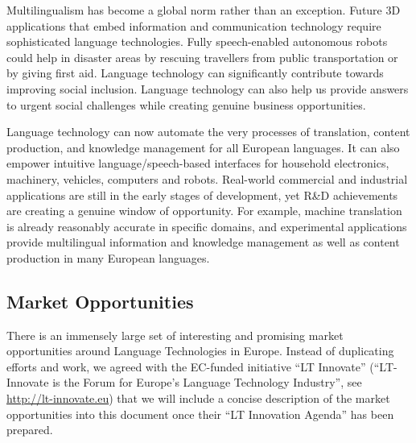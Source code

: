 \documentclass[10pt, plain]{../../metanetpaper}
\begin{document}
\begin{multicols}{2}
Multilingualism has become a global norm rather than an exception. Future 3D applications that embed information and communication technology require sophisticated language technologies. Fully speech-enabled autonomous robots could help in disaster areas by rescuing travellers from public transportation or by giving first aid. Language technology can significantly contribute towards improving social inclusion. Language technology can also help us provide answers to urgent social challenges while creating genuine business opportunities.

Language technology can now automate the very processes of translation, content production, and knowledge management for all European languages. It can also empower intuitive language/speech-based interfaces for household electronics, machinery, vehicles, computers and robots. Real-world commercial and industrial applications are still in the early stages of development, yet R\&D achievements are creating a genuine window of opportunity. For example, machine translation is already reasonably accurate in specific domains, and experimental applications provide multilingual information and knowledge management as well as content production in many European languages. 

\subsection{Market Opportunities}
\label{sec:market-opportunities}

There is an immensely large set of interesting and promising market opportunities around Language Technologies in Europe. Instead of duplicating efforts and work, we agreed with the EC-funded initiative ``LT Innovate'' (``LT-Innovate is the Forum for Europe's Language Technology Industry'', see \url{http://lt-innovate.eu}) that we will include a concise description of the market opportunities into this document once their ``LT Innovation Agenda'' has been prepared.

\end{multicols}

\clearpage


\end{document}

